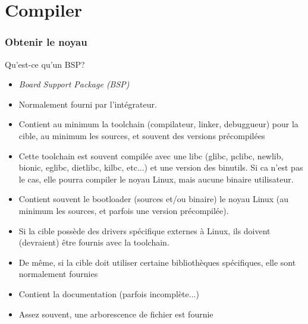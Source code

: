 %
%
%

\part{Compiler}

\section{Obtenir le noyau}

\begin{frame}[fragile=singleslide]{Qu'est-ce qu'un BSP?}
  \begin{itemize} 
  \item \emph{Board Support Package (BSP)}
  \item Normalement fourni par l'intégrateur.
  \item  Contient  au   minimum  la  toolchain  (compilateur,  linker,
    debuggueur) pour la cible, au  minimum les sources, et souvent des
    versions précompilées
  \item  Cette toolchain est  souvent compilée  avec une  libc (glibc,
    µclibc, newlib,  bionic, eglibc,  dietlibc, kilbc, etc...)  et une
    version des binutils. Si ca n'est pas le cas, elle pourra compiler
    le noyau Linux, mais aucune binaire utilisateur.
  \item  Contient souvent  le  bootloader (sources  et/ou binaire)  le
    noyau  Linux  (au minimum  les  sources,  et  parfois une  version
    précompilée).
  \item Si la  cible possède des drivers spécifique  externes à Linux,
    ils doivent (devraient) être fournis avec la toolchain.
  \item  De même,  si la  cible doit  utiliser  certaine bibliothèques
    spécifiques, elle sont normalement fournies
  \item Contient la documentation (parfois incomplète...)
  \item Assez souvent, une arborescence de fichier est fournie
\end{itemize} 
\end{frame} 


